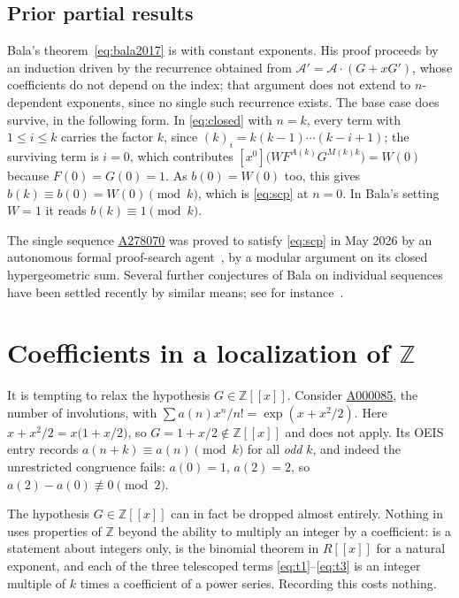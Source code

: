 \documentclass[11pt,a4paper]{article}
\theoremstyle{plain}
\theoremstyle{definition}
\newcommand{\Z}{\mathbb{Z}}
\newcommand{\ff}[2]{(#1)_{#2}}
\newcommand{\coeff}[1]{[x^{#1}]}
\newcommand{\oeis}[1]{\href{https://oeis.org/#1}{\underline{#1}}}
\begin{document}
\subsection{Prior partial results}

Bala's theorem~\eqref{eq:bala2017} is  with constant exponents. His proof
proceeds by an induction driven by the recurrence obtained from
$\mathcal{A}'=\mathcal{A}\cdot(G+xG')$, whose coefficients do not depend on the index; that
argument does not extend to $n$-dependent exponents, since no single such recurrence
exists. The base case does survive, in the following form. In \eqref{eq:closed} with
$n=k$, every term with $1\le i\le k$ carries the factor $k$, since
$\ff{k}{i}=k(k-1)\cdots(k-i+1)$; the surviving term is $i=0$, which contributes
$\coeff{0}\big(W F^{A(k)}G^{M(k)k}\big)=W(0)$ because $F(0)=G(0)=1$. As $b(0)=W(0)$ too,
this gives $b(k)\equiv b(0)=W(0) \pmod k$, which is \eqref{eq:scp} at $n=0$. In Bala's
setting $W=1$ it reads $b(k)\equiv1\pmod k$.

The single sequence \oeis{A278070} was proved to satisfy \eqref{eq:scp} in May 2026 by an
autonomous formal proof-search agent~\cite{adamczewski2026}, by a modular argument on its
closed hypergeometric sum. Several further conjectures of Bala on individual sequences
have been settled recently by similar means; see for instance~\cite{kallat2026}.

\section{Coefficients in a localization of \texorpdfstring{$\Z$}{Z}}\label{sec:fails}

It is tempting to relax the hypothesis $G\in\Z[[x]]$. Consider \oeis{A000085}, the number
of involutions, with $\sum a(n)x^n/n!=\exp(x+x^{2}/2)$. Here
$x+x^{2}/2=x\big(1+x/2\big)$, so $G=1+x/2\notin\Z[[x]]$ and  does not
apply. Its OEIS entry records $a(n+k)\equiv a(n)\pmod k$ for all \emph{odd} $k$, and
indeed the unrestricted congruence fails: $a(0)=1$, $a(2)=2$, so
$a(2)-a(0)\not\equiv0\pmod2$.

The hypothesis $G\in\Z[[x]]$ can in fact be dropped almost entirely. Nothing in
 uses properties of $\Z$ beyond the ability to multiply an integer by a
coefficient:  is a statement about integers only,  is the
binomial theorem in $R[[x]]$ for a natural exponent, and each of the three telescoped
terms \eqref{eq:t1}--\eqref{eq:t3} is an integer multiple of $k$ times a coefficient of a
power series. Recording this costs nothing.
\end{document}
